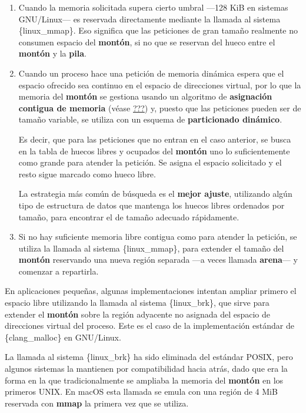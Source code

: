 \begin{enumerate}
\def\labelenumi{\arabic{enumi}.}
\item
  Cuando la memoria solicitada supera cierto umbral ---128 KiB en
  sistemas GNU/Linux--- es reservada directamente mediante la llamada al
  sistema \{linux\_mmap\}. Eso significa que las peticiones de gran
  tamaño realmente no consumen espacio del \textbf{montón}, si no que se
  reservan del hueco entre el \textbf{montón} y la \textbf{pila}.
\item
  Cuando un proceso hace una petición de memoria dinámica espera que el
  espacio ofrecido sea continuo en el espacio de direcciones virtual,
  por lo que la memoria del \textbf{montón} se gestiona usando un
  algoritmo de \textbf{asignación contigua de memoria} (véase
  \hyperref[_asignaciuxf3n_contigua_de_memoria]{???}) y, puesto que las
  peticiones pueden ser de tamaño variable, se utiliza con un esquema de
  \textbf{particionado dinámico}.

  Es decir, que para las peticiones que no entran en el caso anterior,
  se busca en la tabla de huecos libres y ocupados del \textbf{montón}
  uno lo suficientemente como grande para atender la petición. Se asigna
  el espacio solicitado y el resto sigue marcado como hueco libre.

  La estrategia más común de búsqueda es el \textbf{mejor ajuste},
  utilizando algún tipo de estructura de datos que mantenga los huecos
  libres ordenados por tamaño, para encontrar el de tamaño adecuado
  rápidamente.
\item
  Si no hay suficiente memoria libre contigua como para atender la
  petición, se utiliza la llamada al sistema \{linux\_mmap\}, para
  extender el tamaño del \textbf{montón} reservando una nueva región
  separada ---a veces llamada \textbf{{}arena}--- y comenzar a
  repartirla.
\end{enumerate}

En aplicaciones pequeñas, algunas implementaciones intentan ampliar
primero el espacio libre utilizando la llamada al sistema
\{linux\_brk\}, que sirve para extender el \textbf{montón} sobre la
región adyacente no asignada del espacio de direcciones virtual del
proceso. Este es el caso de la implementación estándar de
\{clang\_malloc\} en GNU/Linux.

La llamada al sistema \{linux\_brk\} ha sido eliminada del estándar
POSIX, pero algunos sistemas la mantienen por compatibilidad hacia
atrás, dado que era la forma en la que tradicionalmente se ampliaba la
memoria del \textbf{montón} en los primeros UNIX. En macOS esta llamada
se emula con una región de 4 MiB reservada con \textbf{mmap} la primera
vez que se utiliza.

